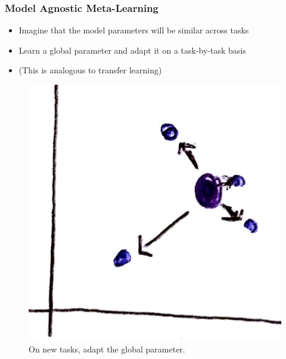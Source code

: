 \documentclass[10pt,mathserif]{beamer}
\begin{document}
\begin{frame}
  \frametitle{Model Agnostic Meta-Learning \citep{finn2017model}}
 \begin{itemize}
 \item Imagine that the model parameters will be similar across tasks
 \item Learn a global parameter and adapt it on a task-by-task basis
 \item (This is analogous to transfer learning)
 \end{itemize}
\begin{figure}[ht]
  \centering
  \includegraphics[width=0.4\paperwidth]{figure/maml_global}
  \caption{On new tasks, adapt the global parameter.\label{fig:maml_global} }
\end{figure}
\end{frame}
\end{document}
